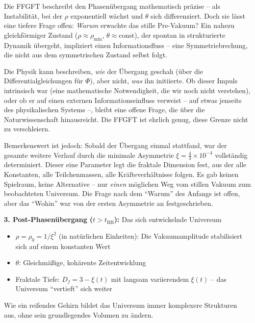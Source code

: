\begin{remark}
Die FFGFT beschreibt den Phasenübergang mathematisch präzise -- als Instabilität, bei der $\rho$ exponentiell wächst und $\theta$ sich differenziert. Doch sie lässt eine tiefere Frage offen: \textit{Warum} erwachte das stille Pre-Vakuum? Ein nahezu gleichförmiger Zustand ($\rho \approx \rho_{\min}$, $\theta \approx \text{const}$), der spontan in strukturierte Dynamik übergeht, impliziert einen Informationsfluss -- eine Symmetriebrechung, die nicht aus dem symmetrischen Zustand selbst folgt.

Die Physik kann beschreiben, \textit{wie} der Übergang geschah (über die Differentialgleichungen für $\Phi$), aber nicht, \textit{was} ihn initiierte. Ob dieser Impuls intrinsisch war (eine mathematische Notwendigkeit, die wir noch nicht verstehen), oder ob er auf einen externen Informationseinfluss verweist -- auf etwas jenseits des physikalischen Systems --, bleibt eine offene Frage, die über die Naturwissenschaft hinausreicht. Die FFGFT ist ehrlich genug, diese Grenze nicht zu verschleiern.

Bemerkenswert ist jedoch: Sobald der Übergang einmal stattfand, war der gesamte weitere Verlauf durch die minimale Asymmetrie $\xi = \frac{4}{3} \times 10^{-4}$ vollständig determiniert. Dieser eine Parameter legt die fraktale Dimension fest, aus der alle Konstanten, alle Teilchenmassen, alle Kräfteverhältnisse folgen. Es gab keinen Spielraum, keine Alternative -- nur \textit{einen} möglichen Weg vom stillen Vakuum zum beobachteten Universum. Die Frage nach dem \enquote{Warum} des Anfangs ist offen, aber das \enquote{Wohin} war von der ersten Asymmetrie an festgeschrieben.
\end{remark}

\textbf{3. Post-Phasenübergang ($t > t_{\text{BB}}$):} Das sich entwickelnde Universum

\begin{itemize}[leftmargin=*]
\item $\rho = \rho_0 = 1/\xi^2$ (in natürlichen Einheiten): Die Vakuumamplitude stabilisiert sich auf einem konstanten Wert
\item $\theta$: Gleichmäßige, kohärente Zeitentwicklung
\item Fraktale Tiefe: $D_f = 3 - \xi(t)$ mit langsam variierendem $\xi(t)$ -- das Universum \enquote{vertieft} sich weiter
\end{itemize}

Wie ein reifendes Gehirn bildet das Universum immer komplexere Strukturen aus, ohne sein grundlegendes Volumen zu ändern.

